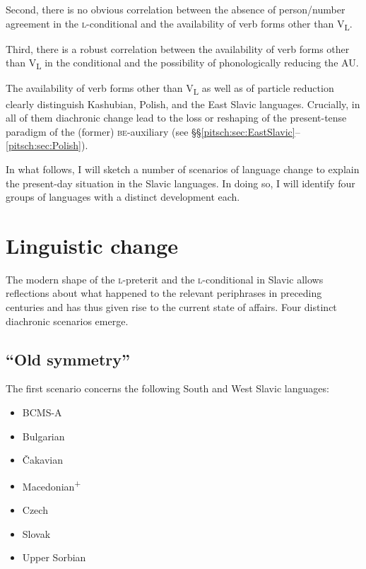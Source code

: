 \documentclass[output=paper]{langscibook}
\begin{document}
Second, there is no obvious correlation between the absence of person/number agreement in the \textsc{l-}conditional and the availability of verb forms other than V\textsubscript{L}.

Third, there is a robust correlation between the availability of verb forms other than V\textsubscript{L} in the conditional and the possibility of phonologically reducing the AU.

The availability of verb forms other than V\textsubscript{L} as well as of particle reduction clearly distinguish Kashubian, Polish, and the East Slavic languages. Crucially, in all of them diachronic change lead to the loss or reshaping of the present-tense paradigm of the (former) \textsc{be}-auxiliary (see §§\ref{pitsch:sec:EastSlavic}--\ref{pitsch:sec:Polish}). 

In what follows, I will sketch a number of scenarios of language change to explain the present-day situation in the Slavic languages. In doing so, I will identify four groups of languages with a distinct development each.


\section{Linguistic change}\label{pitsch:sec:change}

The modern shape of the \textsc{l-}preterit and the \textsc{l-}conditional in Slavic allows reflections about what happened to the relevant periphrases in preceding centuries and has thus given rise to the current state of affairs. Four distinct diachronic scenarios emerge. 


\subsection{``Old symmetry''}\label{pitsch:sec:old_symmetry}

The first scenario concerns the following South and West Slavic languages:

\begin{multicols}{3}
\begin{itemize}
    \item BCMS-A
    \item Bulgarian
    \item Čakavian
    \item Macedonian\textsuperscript{+}
    \item Czech
    \item Slovak
    \item Upper Sorbian
\end{itemize}
\end{multicols}
    
\end{document}
